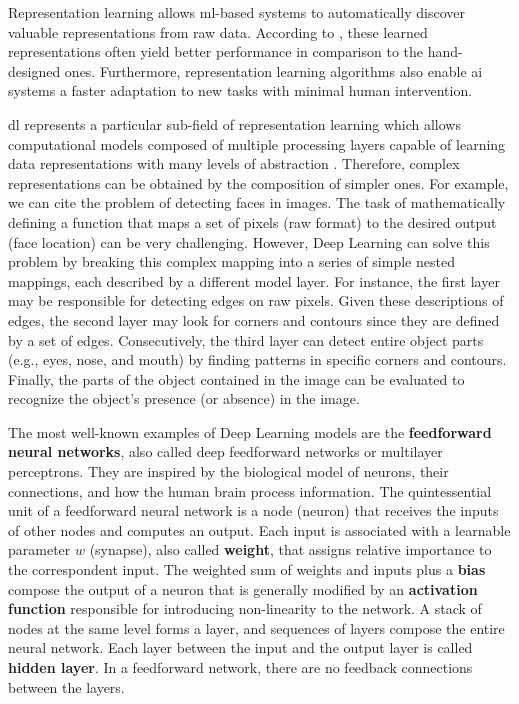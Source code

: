 Representation learning allows \acs{ml}-based systems to automatically discover valuable representations from raw data. According to \cite{goodfellow2016deep}, these learned representations often yield better performance in comparison to the hand-designed ones. Furthermore, representation learning algorithms also enable \acs{ai} systems a faster adaptation to new tasks with minimal human intervention.


\acf{dl} represents a particular sub-field of representation learning which allows computational models composed of multiple processing layers capable of learning data representations with many levels of abstraction \citep{lecun2015deep}. Therefore, complex representations can be obtained by the composition of simpler ones. For example, we can cite the problem of detecting faces in images. The task of mathematically defining a function that maps a set of pixels (raw format) to the desired output (face location) can be very challenging. However, Deep Learning can solve this problem by breaking this complex mapping into a series of simple nested mappings, each described by a different model layer. For instance, the first layer may be responsible for detecting edges on raw pixels. Given these descriptions of edges, the second layer may look for corners and contours since they are defined by a set of edges. Consecutively, the third layer can detect entire object parts (e.g., eyes, nose, and mouth) by finding patterns in specific corners and contours. Finally, the parts of the object contained in the image can be evaluated to recognize the object's presence (or absence) in the image.

The most well-known examples of Deep Learning models are the \textbf{feedforward neural networks}, also called deep feedforward networks or multilayer perceptrons. They are inspired by the biological model of neurons, their connections, and how the human brain process information. The quintessential unit of a feedforward neural network is a node (neuron) that receives the inputs of other nodes and computes an output. Each input is associated with a learnable parameter $w$ (synapse), also called \textbf{weight}, that assigns relative importance to the correspondent input. The weighted sum of weights and inputs plus a \textbf{bias} compose the output of a neuron that is generally modified by an \textbf{activation function} responsible for introducing non-linearity to the network. A stack of nodes at the same level forms a layer, and sequences of layers compose the entire neural network. Each layer between the input and the output layer is called \textbf{hidden layer}. In a feedforward network, there are no feedback connections between the layers.

